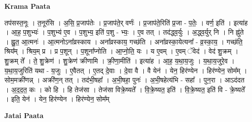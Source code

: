 \documentclass[17pt]{extarticle}
\begin{document}
\textbf{Krama Paata} \newline

तप॑सस्त॒नूः । त॒नूर॑सि । अ॒सि॒ प्र॒जाप॑तेः । प्र॒जाप॑ते॒र् वर्णः॑ । प्र॒जाप॑ते॒रिति॑ प्र॒जा - प॒तेः॒ । वर्ण॒ इति॑ । इत्या॑ह । आ॒ह॒ प॒शुभ्यः॑ । प॒शुभ्य॑ ए॒व । प॒शुभ्य॒ इति॑ प॒शु - भ्यः॒ । ए॒व तत् । तद॑द्ध्व॒र्युः । अ॒द्ध्व॒र्युर् नि । नि ह्नु॑ते । ह्नु॒त॒ आ॒त्मनः॑ । आ॒त्मनोऽना᳚व्रस्काय । अना᳚व्रस्काय॒ गच्छ॑ति । अना᳚व्रस्का॒येत्यना᳚ - व्र॒स्का॒य॒ । गच्छ॑ति॒ श्रिय᳚म् । श्रिय॒म् प्र । प्र प॒शून् । प॒शूना᳚प्नोति । आ॒प्नो॒ति॒ यः । य ए॒वम् । ए॒वम् ॅवेद॑ । वेद॑ शु॒क्रम् । शु॒क्रम् ते᳚ । ते॒ शु॒क्रेण॑ । शु॒क्रेण॑ क्रीणामि । क्री॒णा॒मीति॑ । इत्या॑ह । आ॒ह॒ य॒था॒य॒जुः । य॒था॒य॒जुरे॒व । य॒था॒य॒जुरिति॑ यथा - य॒जुः । ए॒वैतत् । ए॒तद् दे॒वाः । दे॒वा वै । वै येन॑ । येन॒ हिर॑ण्येन । हिर॑ण्येन॒ सोम᳚म् । सोम॒मक्री॑णन्न् । अक्री॑ण॒न् तत् । तद॑भी॒षहा᳚ । अ॒भी॒षहा॒ पुनः॑ । अ॒भी॒षहेत्य॑भि - सहा᳚ । पुन॒रा । आऽद॑दत । अ॒द॒द॒त॒ कः । को हि । हि तेज॑सा । तेज॑सा विक्रे॒ष्यते᳚ । वि॒क्रे॒ष्यत॒ इति॑ । वि॒क्रे॒ष्यत॒ इति॑ वि - क्रे॒ष्यते᳚ । इति॒ येन॑ । येन॒ हिर॑ण्येन । हिर॑ण्येन॒ सोम᳚म् \newline

\textbf{Jatai Paata} \newline
\end{document}
